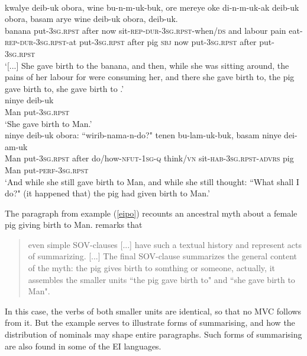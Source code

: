 \ea \label{eipo}
\\
\ea
\gll kwalye deib-uk obora, wine bu-n-m-uk-buk, ore  mereye oke di-n-m-uk-ak deib-uk obora, basam arye wine deib-uk obora,  deib-uk. \\
banana put-3\textsc{sg}.\textsc{rpst} after now sit-\textsc{rep}-\textsc{dur}-3\textsc{sg}.\textsc{rpst}-when/\textsc{ds} and  labour pain eat-\textsc{rep}-\textsc{dur}-3\textsc{sg}.\textsc{rpst}-at put-3\textsc{sg}.\textsc{rpst} after pig \textsc{sbj} now put-3\textsc{sg}.\textsc{rpst} after  put-3\textsc{sg}.\textsc{rpst} \\
\glft `[...] She gave birth to the banana, and then, while she was sitting around, the pains of her labour for  were consuming her, and there she gave birth to, the pig gave birth to, she gave birth to .' \\ 
\ex
\gll ninye deib-uk \\
Man put-3\textsc{sg}.\textsc{rpst} \\
\glft `She gave birth to Man.' \\ 
\ex
\gll ninye deib-uk obora: ``wirib-nama-n-do?" tenen bu-lam-uk-buk, basam ninye dei-am-uk \\ 
Man put-3\textsc{sg}.\textsc{rpst} after do/how-\textsc{nfut}-1\textsc{sg}-\textsc{q} think/\textsc{vn} sit-\textsc{hab}-3\textsc{sg}.\textsc{rpst}-\textsc{advrs} pig Man put-\textsc{perf}-3\textsc{sg}.\textsc{rpst} \\
\glft `And while she still gave birth to Man, and while she still thought: ``What shall I do?" (it happened that) the pig had given birth to Man.'\\ 
\z
\z

The paragraph from example (\ref{eipo}) recounts an ancestral myth about a female pig giving birth to Man. \citet[308]{heeschen1998eipo} remarks that 

\begin{quote}even simple SOV-clauses [...] have such a textual history and represent acts of summarizing. [...] The final SOV-clause summarizes the general content of the myth: the pig gives birth to somthing or someone, actually, it assembles the smaller units ``the pig gave birth to" and ``she gave birth to Man".\end{quote} 

In this case, the verbs of both smaller units are identical, so that no MVC follows from it. But the example serves to illustrate  forms of summarising, and how the distribution of nominals may shape entire paragraphs. Such forms of summarising are also found in some of the EI languages.


